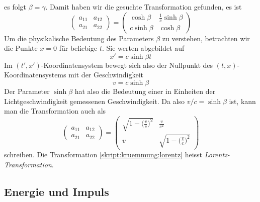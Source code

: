 es folgt $\beta=\gamma$.
Damit haben wir die gesuchte Transformation gefunden, es ist
\begin{equation}
\begin{pmatrix}
a_{11}&a_{12}\\
a_{21}&a_{22}
\end{pmatrix}
=
\begin{pmatrix}
 \cosh\beta&\frac1c\sinh\beta\\
c\sinh\beta&\cosh\beta
\end{pmatrix}
\end{equation}
Um die physikalische Bedeutung des Parameters $\beta$ zu verstehen, 
betrachten wir die Punkte $x=0$ für beliebige $t$.
Sie werten abgebildet auf
\[
x' = c\sinh\beta t
\]
Im $(t',x')$-Koordinatensystem bewegt sich also der Nullpunkt des 
$(t,x)$-Koordinatensystems mit der Geschwindigkeit
\[
v=c\sinh\beta
\]
Der Parameter $\sinh\beta$ hat also die Bedeutung einer in Einheiten
der Lichtgeschwindigkeit gemessenen Geschwindigkeit.
Da also $v/c=\sinh\beta$ ist, kann man die Transformation auch
als
\begin{equation}
\begin{pmatrix}
a_{11}&a_{12}\\
a_{21}&a_{22}
\end{pmatrix}
=
\begin{pmatrix}
\displaystyle\sqrt{1-\biggl(\frac{v}{c}\biggr)^2}
	&\displaystyle\frac{v}{c^2} \\
v
	&\displaystyle\sqrt{1-\biggl(\frac{v}{c}\biggr)^2}
\end{pmatrix}
\label{skript:kruemmung:lorentz}
\end{equation}
schreiben.
Die Transformation 
\eqref{skript:kruemmung:lorentz}
heisst {\em Lorentz-Transformation}.


\subsection{Energie und Impuls}


